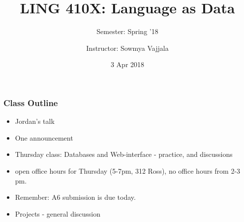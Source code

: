 \documentclass{beamer}
\author[Sowmya Vajjala]{Instructor: Sowmya Vajjala}
\title[LING 410X]{LING 410X: Language as Data}
\subtitle{Semester: Spring '18}
\date{3 Apr 2018}
\institute{Iowa State University, USA}
\begin{document}
\begin{frame}\titlepage
\end{frame}

\begin{frame}
\frametitle{Class Outline}
\begin{itemize}
\item Jordan's talk
\item One announcement
\item Thursday class: Databases and Web-interface - practice, and discussions
\item open office hours for Thursday (5-7pm, 312 Ross), no office hours from 2-3 pm.
\item Remember: A6 submission is due today.
\item Projects - general discussion
\end{itemize}
\end{frame}
\end{document}
